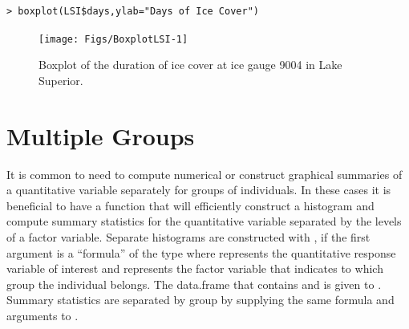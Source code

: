 \documentclass[10pt,openany]{book}\usepackage[]{graphicx}\usepackage[]{color}
\makeatletter
\newenvironment{kframe}{%
 \def\at@end@of@kframe{}%
 \ifinner\ifhmode%
  \def\at@end@of@kframe{\end{minipage}}%
  \begin{minipage}{\columnwidth}%
 \fi\fi%
 \def\FrameCommand##1{\hskip\@totalleftmargin \hskip-\fboxsep
 \colorbox{shadecolor}{##1}\hskip-\fboxsep
     \hskip-\linewidth \hskip-\@totalleftmargin \hskip\columnwidth}%
 \MakeFramed {\advance\hsize-\width
   \@totalleftmargin\z@ \linewidth\hsize
   \@setminipage}}%
 {\par\unskip\endMakeFramed%
 \at@end@of@kframe}
\newenvironment{knitrout}{}{} %
\makeatother
\begin{document}
\begin{knitrout}
\color{fgcolor}\begin{kframe}
\begin{verbatim}
> boxplot(LSI$days,ylab="Days of Ice Cover")
\end{verbatim}
\end{kframe}\begin{figure}[hbtp]

{\centering \texttt{[image: Figs/BoxplotLSI-1]} 

}

\caption[Boxplot of the duration of ice cover at ice gauge 9004 in Lake Superior]{Boxplot of the duration of ice cover at ice gauge 9004 in Lake Superior.}\label{fig:BoxplotLSI}
\end{figure}


\end{knitrout}



\section{Multiple Groups} \label{sect:MultGroups}
It is common to need to compute numerical or construct graphical summaries of a quantitative variable separately for groups of individuals. In these cases it is beneficial to have a function that will efficiently construct a histogram and compute summary statistics for the quantitative variable separated by the levels of a factor variable. Separate histograms are constructed with , if the first argument is a ``formula'' of the type  where  represents the quantitative response variable of interest and  represents the factor variable that indicates to which group the individual belongs. The data.frame that contains  and  is given to . Summary statistics are separated by group by supplying the same formula and  arguments to .
\end{document}
